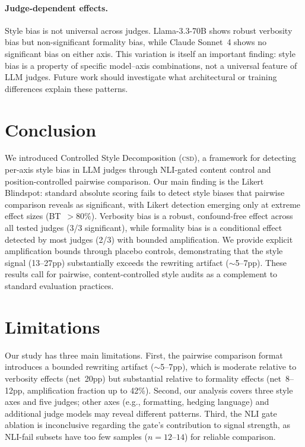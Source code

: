 \documentclass[11pt]{article}
\newcommand{\csd}{\textsc{csd}}
\begin{document}
\paragraph{Judge-dependent effects.}
Style bias is not universal across judges.
Llama-3.3-70B shows robust verbosity bias but non-significant formality bias, while Claude Sonnet~4 shows no significant bias on either axis.
This variation is itself an important finding: style bias is a property of specific model--axis combinations, not a universal feature of LLM judges.
Future work should investigate what architectural or training differences explain these patterns.

\section{Conclusion}

We introduced Controlled Style Decomposition (\csd{}), a framework for detecting per-axis style bias in LLM judges through NLI-gated content control and position-controlled pairwise comparison.
Our main finding is the Likert Blindspot: standard absolute scoring fails to detect style biases that pairwise comparison reveals as significant, with Likert detection emerging only at extreme effect sizes (BT~$> 80\%$).
Verbosity bias is a robust, confound-free effect across all tested judges (3/3 significant), while formality bias is a conditional effect detected by most judges (2/3) with bounded amplification.
We provide explicit amplification bounds through placebo controls, demonstrating that the style signal (13--27pp) substantially exceeds the rewriting artifact (${\sim}$5--7pp).
These results call for pairwise, content-controlled style audits as a complement to standard evaluation practices.

\section*{Limitations}

Our study has three main limitations.
First, the pairwise comparison format introduces a bounded rewriting artifact (${\sim}$5--7pp), which is moderate relative to verbosity effects (net~20pp) but substantial relative to formality effects (net~8--12pp, amplification fraction up to 42\%).
Second, our analysis covers three style axes and five judges; other axes (e.g., formatting, hedging language) and additional judge models may reveal different patterns.
Third, the NLI gate ablation is inconclusive regarding the gate's contribution to signal strength, as NLI-fail subsets have too few samples ($n = 12$--$14$) for reliable comparison.
\end{document}
